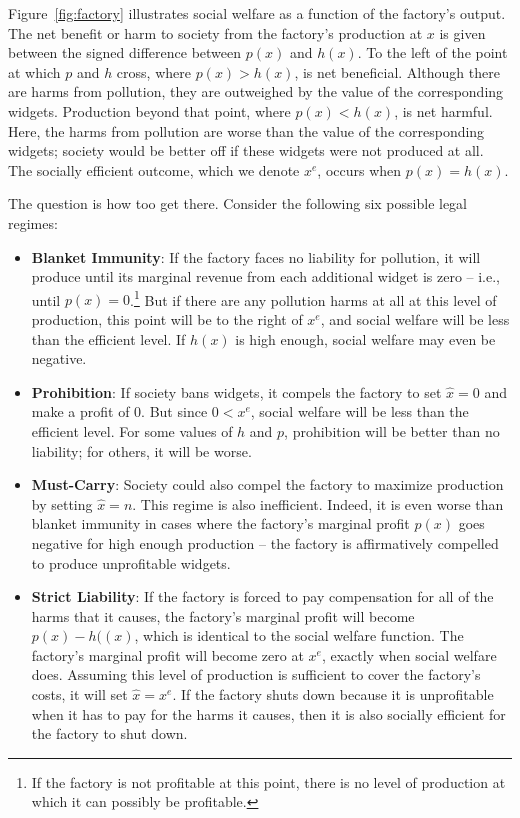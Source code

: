 Figure~\ref{fig:factory} illustrates social welfare as a function of the factory's output. The net benefit or harm to society from the factory's production at $x$ is given between the signed difference between $p(x)$ and $h(x)$. To the left of the point at which $p$ and $h$ cross, where $p(x) > h(x)$, is net beneficial. Although there are harms from pollution, they are outweighed by the value of the corresponding widgets. Production beyond that point, where $p(x) < h(x)$, is net harmful. Here, the harms from pollution are worse than the value of the corresponding widgets; society would be better off if these widgets were not produced at all. The socially efficient outcome, which we denote $x^e$, occurs when $p(x) = h(x)$. 

The question is how too get there. Consider the following six possible legal regimes:
\begin{itemize}
\item \textbf{Blanket Immunity}: If the factory faces no liability for pollution, it will produce until its marginal revenue from each additional widget is zero -- i.e., until $p(x) = 0$.\footnote{If the factory is not profitable at this point, there is no level of production at which it can possibly be profitable.} But if there are any pollution harms at all at this level of production, this point will be to the right of $x^e$, and social welfare will be less than the efficient level. If $h(x)$ is high enough, social welfare may even be negative.
\item \textbf{Prohibition}: If society bans widgets, it compels the factory to set $\hat{x} = 0$ and make a profit of $0$. But since $0 < x^e$, social welfare will be less than the efficient level. For some values of $h$ and $p$, prohibition will be better than no liability; for others, it will be worse.
\item \textbf{Must-Carry}: Society could also compel the factory to maximize production by setting $\hat{x} = n$. This regime is also inefficient. Indeed, it is even worse than blanket immunity in cases where the factory's marginal profit $p(x)$ goes negative for high enough production -- the factory is affirmatively compelled to produce unprofitable widgets. 
\item \textbf{Strict Liability}: If the factory is forced to pay compensation for all of the harms that it causes, the factory's marginal profit will become $p(x) - h((x)$, which is identical to the social welfare function. The factory's marginal profit will become zero at $x^e$, exactly when social welfare does. Assuming this level of production is sufficient to cover the factory's costs, it will set $\hat{x} = x^e$. If the factory shuts down because it is unprofitable when it has to pay for the harms it causes, then it is also socially efficient for the factory to shut down.

\end{itemize}
